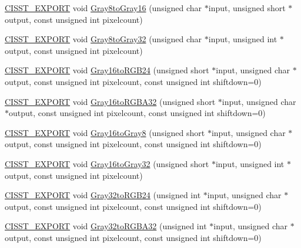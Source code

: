 \begin{DoxyCompactItemize}
\item 
\hyperlink{cmn_export_macros_8h_a99393e0c3ac434b2605235bbe20684f8}{C\+I\+S\+S\+T\+\_\+\+E\+X\+P\+O\+R\+T} void \hyperlink{namespacesvl_converter_a8179b3679c6f8f856a5cf68b9250a5bc}{Gray8to\+Gray16} (unsigned char $\ast$input, unsigned short $\ast$output, const unsigned int pixelcount)
\item 
\hyperlink{cmn_export_macros_8h_a99393e0c3ac434b2605235bbe20684f8}{C\+I\+S\+S\+T\+\_\+\+E\+X\+P\+O\+R\+T} void \hyperlink{namespacesvl_converter_abec323b659f86ba48c507d95725ca0d7}{Gray8to\+Gray32} (unsigned char $\ast$input, unsigned int $\ast$output, const unsigned int pixelcount)
\item 
\hyperlink{cmn_export_macros_8h_a99393e0c3ac434b2605235bbe20684f8}{C\+I\+S\+S\+T\+\_\+\+E\+X\+P\+O\+R\+T} void \hyperlink{namespacesvl_converter_a49ca4a2723e884f1bda2fced5696e7a3}{Gray16to\+R\+G\+B24} (unsigned short $\ast$input, unsigned char $\ast$output, const unsigned int pixelcount, const unsigned int shiftdown=0)
\item 
\hyperlink{cmn_export_macros_8h_a99393e0c3ac434b2605235bbe20684f8}{C\+I\+S\+S\+T\+\_\+\+E\+X\+P\+O\+R\+T} void \hyperlink{namespacesvl_converter_a7e6ba97ccd5bcf36ff38ba60ca259172}{Gray16to\+R\+G\+B\+A32} (unsigned short $\ast$input, unsigned char $\ast$output, const unsigned int pixelcount, const unsigned int shiftdown=0)
\item 
\hyperlink{cmn_export_macros_8h_a99393e0c3ac434b2605235bbe20684f8}{C\+I\+S\+S\+T\+\_\+\+E\+X\+P\+O\+R\+T} void \hyperlink{namespacesvl_converter_a364d33a0a33a01927317032234bae11d}{Gray16to\+Gray8} (unsigned short $\ast$input, unsigned char $\ast$output, const unsigned int pixelcount, const unsigned int shiftdown=0)
\item 
\hyperlink{cmn_export_macros_8h_a99393e0c3ac434b2605235bbe20684f8}{C\+I\+S\+S\+T\+\_\+\+E\+X\+P\+O\+R\+T} void \hyperlink{namespacesvl_converter_a90d96aa37f01587bd37866dab12c6faf}{Gray16to\+Gray32} (unsigned short $\ast$input, unsigned int $\ast$output, const unsigned int pixelcount)
\item 
\hyperlink{cmn_export_macros_8h_a99393e0c3ac434b2605235bbe20684f8}{C\+I\+S\+S\+T\+\_\+\+E\+X\+P\+O\+R\+T} void \hyperlink{namespacesvl_converter_ac6222bc8c15797f692e195de1e94ce3b}{Gray32to\+R\+G\+B24} (unsigned int $\ast$input, unsigned char $\ast$output, const unsigned int pixelcount, const unsigned int shiftdown=0)
\item 
\hyperlink{cmn_export_macros_8h_a99393e0c3ac434b2605235bbe20684f8}{C\+I\+S\+S\+T\+\_\+\+E\+X\+P\+O\+R\+T} void \hyperlink{namespacesvl_converter_aecfb8bb13ca78fb42e807265c7b18dc6}{Gray32to\+R\+G\+B\+A32} (unsigned int $\ast$input, unsigned char $\ast$output, const unsigned int pixelcount, const unsigned int shiftdown=0)

\end{DoxyCompactItemize}
